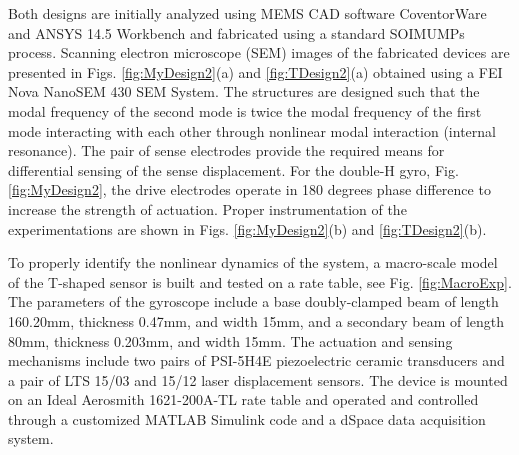 \documentclass[twoside]{article}
\begin{document}
Both designs are initially analyzed using MEMS CAD software CoventorWare and ANSYS 14.5 Workbench and fabricated using a standard SOIMUMPs process. Scanning electron microscope (SEM) images of the fabricated devices are presented in Figs. \ref{fig:MyDesign2}(a) and \ref{fig:TDesign2}(a) obtained using a FEI Nova NanoSEM 430 SEM System. The structures are designed such that the modal frequency of the second mode is twice the modal frequency of the first mode interacting with each other through nonlinear modal interaction (internal resonance). The pair of sense electrodes provide the required means for differential sensing of the sense displacement. For the double-H gyro, Fig. \ref{fig:MyDesign2}, the drive electrodes operate in 180 degrees phase difference to increase the strength of actuation. Proper instrumentation of the experimentations are shown in Figs. \ref{fig:MyDesign2}(b) and \ref{fig:TDesign2}(b).

To properly identify the nonlinear dynamics of the system, a macro-scale model of the T-shaped sensor is built and tested on a rate table, see Fig. \ref{fig:MacroExp}. The parameters of the gyroscope include a base doubly-clamped beam of length 160.20mm, thickness 0.47mm, and width 15mm, and a secondary beam of length 80mm, thickness 0.203mm, and width 15mm. The actuation and sensing mechanisms include two pairs of PSI-5H4E piezoelectric ceramic transducers and a pair of LTS 15/03 and 15/12 laser displacement sensors. The device is mounted on an Ideal Aerosmith 1621-200A-TL rate table and operated and controlled through a customized MATLAB Simulink code and a dSpace data acquisition system. 
\end{document}
